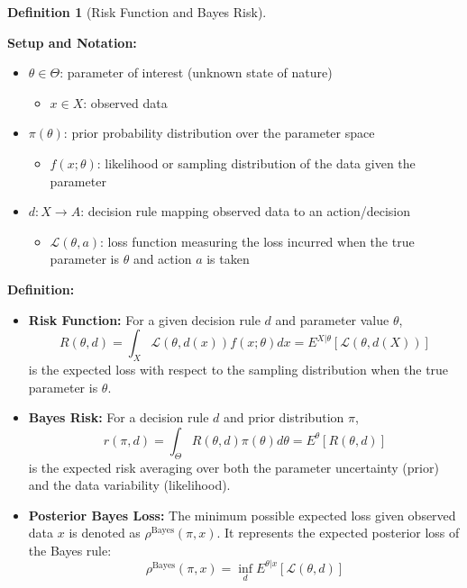 \documentclass[
  letterpaper,
  DIV=11,
  numbers=noendperiod]{scrreprt}
\providecommand{\tightlist}{%
  \setlength{\itemsep}{0pt}\setlength{\parskip}{0pt}}
\renewcommand{\[}{\begin{equation}}
\renewcommand{\]}{\end{equation}}
\theoremstyle{definition}
\newtheorem{definition}{Definition}[chapter]
\theoremstyle{plain}
\theoremstyle{plain}
\theoremstyle{plain}
\theoremstyle{definition}
\theoremstyle{plain}
\theoremstyle{remark}
\begin{document}
\begin{definition}[Risk Function and Bayes
Risk]\protect\hypertarget{def-risk}{}\label{def-risk}

\textbf{Setup and Notation:}

\begin{itemize}
\tightlist
\item
  \(\theta \in \Theta\): parameter of interest (unknown state of nature)

  \begin{itemize}
  \tightlist
  \item
    \(x \in X\): observed data
  \end{itemize}
\item
  \(\pi(\theta)\): prior probability distribution over the parameter
  space

  \begin{itemize}
  \tightlist
  \item
    \(f(x;\theta)\): likelihood or sampling distribution of the data
    given the parameter
  \end{itemize}
\item
  \(d: X \to A\): decision rule mapping observed data to an
  action/decision

  \begin{itemize}
  \tightlist
  \item
    \(\mathcal{L}(\theta, a)\): loss function measuring the loss
    incurred when the true parameter is \(\theta\) and action \(a\) is
    taken
  \end{itemize}
\end{itemize}

\textbf{Definition:}

\begin{itemize}
\item
  \textbf{Risk Function:} For a given decision rule \(d\) and parameter
  value \(\theta\),
  \[R(\theta, d) = \int_{X} \mathcal{L}(\theta, d(x)) f(x;\theta) dx = E^{X|\theta} [ \mathcal{L}(\theta, d(X)) ]\]
  is the expected loss with respect to the sampling distribution when
  the true parameter is \(\theta\).
\item
  \textbf{Bayes Risk:} For a decision rule \(d\) and prior distribution
  \(\pi\),
  \[r(\pi, d) = \int_{\Theta} R(\theta, d) \pi(\theta) d\theta = E^\theta [ R(\theta, d) ]\]
  is the expected risk averaging over both the parameter uncertainty
  (prior) and the data variability (likelihood).
\item
  \textbf{Posterior Bayes Loss:} The minimum possible expected loss
  given observed data \(x\) is denoted as
  \(\rho^{\text{Bayes}}(\pi, x)\). It represents the expected posterior
  loss of the Bayes rule: \[
  \rho^{\text{Bayes}}(\pi, x) = \inf_{d} E^{\theta|x} [ \mathcal{L}(\theta, d) ]
  \]
\end{itemize}

\end{definition}
\end{document}
